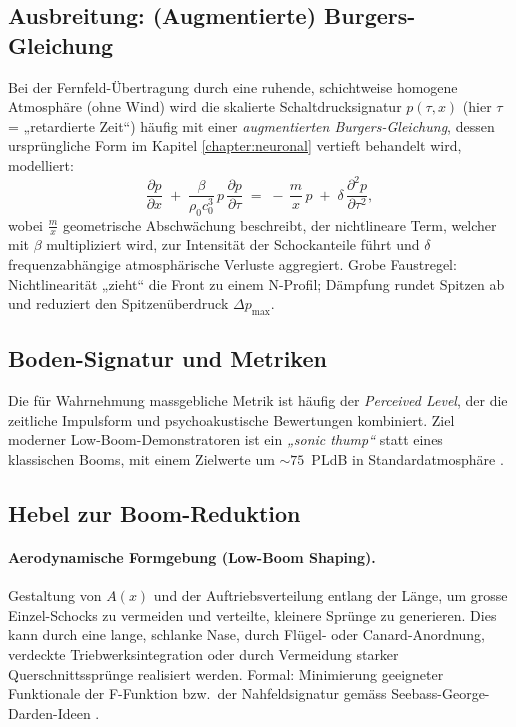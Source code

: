 \subsection{Ausbreitung: (Augmentierte) Burgers-Gleichung}
Bei der Fernfeld-Übertragung durch eine ruhende, schichtweise homogene
Atmosphäre (ohne Wind) wird die skalierte Schaltdrucksignatur $p(\tau,x)$
(hier $\tau$ = „retardierte Zeit“) häufig mit einer \emph{augmentierten Burgers-Gleichung},
dessen ursprüngliche Form im Kapitel \ref{chapter:neuronal} vertieft
behandelt wird, modelliert:
\begin{equation}
  \frac{\partial p}{\partial x}
  \;+\;\frac{\beta}{\rho_0 c_0^{3}}\,p\,\frac{\partial p}{\partial \tau}
  \;=\;
  -\,\frac{m}{x}\,p
  \;+\;\delta\,\frac{\partial^2 p}{\partial \tau^2},
  \label{eq:aug-burgers}
\end{equation}
wobei $\frac{m}{x}$ geometrische Abschwächung beschreibt, der nichtlineare
Term, welcher mit $\beta$ multipliziert wird, zur Intensität der Schockanteile
führt und $\delta$ frequenzabhängige atmosphärische Verluste aggregiert.
Grobe Faustregel: Nichtlinearität „zieht“ die Front zu einem N-Profil; 
Dämpfung rundet Spitzen ab und reduziert den Spitzenüberdruck
$\Delta p_\mathrm{max}$\cite{schall:rallabhandi2023,schall:rallabhandiAIAA2023,schall:burgersJASA}.

\subsection{Boden-Signatur und Metriken}
Die für Wahrnehmung massgebliche Metrik ist häufig der \emph{Perceived Level},
der die zeitliche Impulsform und psychoakustische Bewertungen kombiniert.
Ziel moderner Low-Boom-Demonstratoren ist ein \emph{„sonic thump“} statt
eines klassischen Booms, mit einem Zielwerte um
${\sim}75$\ PLdB in Standardatmosphäre \cite{schall:x59pldb}.

\subsection{Hebel zur Boom-Reduktion}
\paragraph{Aerodynamische Formgebung (Low-Boom Shaping).}
Gestaltung von $A(x)$ und der Auftriebsverteilung entlang der Länge,
um grosse Einzel-Schocks zu vermeiden und verteilte, kleinere Sprünge zu generieren.
Dies kann durch eine lange, schlanke Nase, durch Flügel- oder Canard-Anordnung,
verdeckte Triebwerksintegration oder durch Vermeidung starker
Querschnittssprünge realisiert werden.
Formal: Minimierung geeigneter Funktionale der F-Funktion bzw.\ der Nahfeldsignatur
gemäss Seebass-George-Darden-Ideen \cite{schall:seebassgeorge,schall:darden75}.

